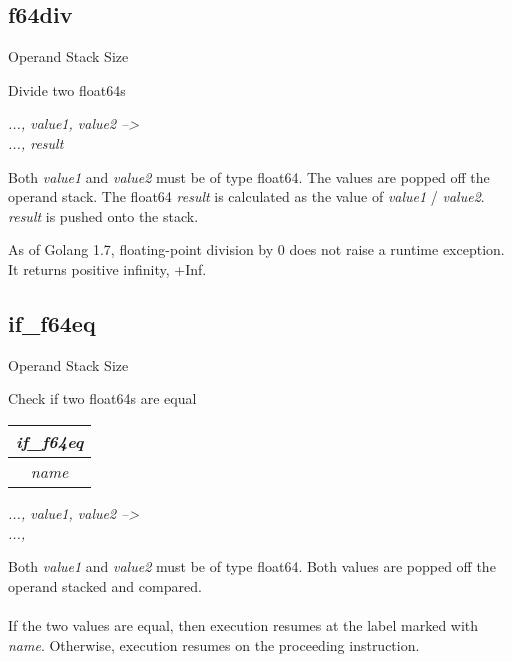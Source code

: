 \documentclass[12pt]{article}
\begin{document}
		\subsection*{f64div}
			\begin{labeling}{Operand Stack Size}
				\item [\textbf{Operation}] Divide two float64s
				\item [\textbf{Format}] 
				\item [\textbf{Operand Stack}] \textit{..., value1, value2 --\textgreater} \\
										\textit{..., result}
				\item [\textbf{Description}] Both \textit{value1} and \textit{value2} must be of type float64. The values are popped off the operand stack. The float64 \textit{result} is calculated as the value of \textit{value1} / \textit{value2}. \textit{result} is pushed onto the stack. \\ 
				\item [\textbf{Notes}] As of Golang 1.7, floating-point division by 0 does not raise a runtime exception. It returns positive infinity, +Inf.
			\end{labeling}	
		\newpage
		
		\subsection*{if\_f64eq}
			\begin{labeling}{Operand Stack Size}
				\item [\textbf{Operation}] Check if two float64s are equal 
				\item [\textbf{Format}] \begin{tabular}{| c |} \hline \textit{if\_f64eq} \\ \hline \textit{name} \\ \hline \end{tabular}
				\item [\textbf{Operand Stack}] \textit{..., value1, value2 --\textgreater} \\
										\textit{..., }
				\item [\textbf{Description}] Both \textit{value1} and \textit{value2} must be of type float64. Both values are popped off the operand stacked and compared. \\ \\
				If the two values are equal, then execution resumes at the label marked with \textit{name}. Otherwise, execution resumes on the proceeding instruction. 
			\end{labeling}	
		\newpage
		
\end{document}
